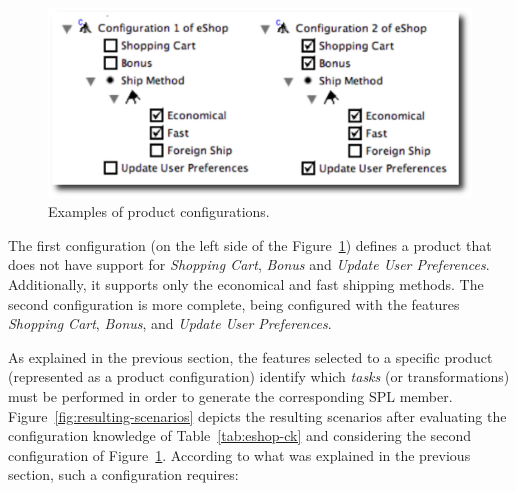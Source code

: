  \begin{figure}[h]
 \begin{center}
  \includegraphics[scale=0.33]{img/pc-04.eps}
   \caption{Examples of product configurations.}
  \label{fig:product-config-01-02}
  \end{center}
\end{figure}

The first configuration (on the left side of the
Figure~\ref{fig:product-config-01-02}) defines a product that does not have support for
\emph{Shopping Cart}, \emph{Bonus} and \emph{Update User Preferences}.
Additionally, it supports only the economical and fast shipping methods. The
second configuration is more complete, being configured with the features
\emph{Shopping Cart}, \emph{Bonus}, and \emph{Update User Preferences}.

As explained in the previous section, the features selected to a specific product
(represented as a product configuration) identify which \emph{tasks} (or
transformations) must be performed in order to generate the corresponding SPL
member. 
Figure~\ref{fig:resulting-scenarios} depicts the resulting scenarios after evaluating the configuration knowledge of
Table~\ref{tab:eshop-ck} and considering the second configuration of
Figure~\ref{fig:product-config-01-02}. According to what was explained in the
previous section, such a configuration requires: 

